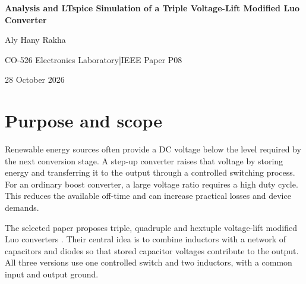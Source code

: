 \documentclass[11pt,a4paper]{article}
\begin{document}
\begin{center}
{\Large\bfseries Analysis and LTspice Simulation of a Triple Voltage-Lift Modified Luo Converter}\par
\vspace{4mm}
{\large Aly Hany Rakha}\par
CO-526 Electronics Laboratory\quad |\quad IEEE Paper P08\par
28 October 2026
\end{center}
\vspace{2mm}
\begin{abstract}
This report examines the modified Luo converters proposed by Gholizadeh et al. and reproduces the triple voltage-lift circuit in LTspice. The analysis follows the two switching states, derives the voltage gain and capacitor voltages, and compares these predictions with transient simulations. With a 50 V input, 100 kHz switching frequency and approximately 50\% duty cycle, the near-ideal model gives an average output of 299.45 V, compared with the ideal prediction of 300 V. Both inductor currents remain positive in the measured steady-state interval. Tests at 30\% and 60\% duty give 213.97 V and 374.41 V, respectively. Additional models introduce conduction losses and replace the ideal switch with a MOSFET model. The final MOSFET simulation gives 295.10 V and a simulated efficiency of 97.58\%, including the gate source power. These results support the steady-state operating principle, while the startup overshoot, model simplifications and sensitivity of small ripple measurements limit what can be concluded about hardware performance.
\end{abstract}
\section{Purpose and scope}
Renewable energy sources often provide a DC voltage below the level required by the next conversion stage. A step-up converter raises that voltage by storing energy and transferring it to the output through a controlled switching process. For an ordinary boost converter, a large voltage ratio requires a high duty cycle. This reduces the available off-time and can increase practical losses and device demands.

The selected paper proposes triple, quadruple and hextuple voltage-lift modified Luo converters \cite{paper}. Their central idea is to combine inductors with a network of capacitors and diodes so that stored capacitor voltages contribute to the output. All three versions use one controlled switch and two inductors, with a common input and output ground.
\end{document}
